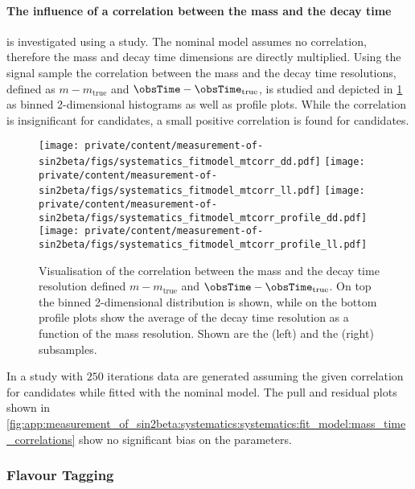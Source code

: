 \paragraph{The influence of a correlation between the mass and the decay time}
is investigated using a \ToyMC study. The nominal \PDF model assumes no
correlation, therefore the mass and decay time dimensions are directly
multiplied. Using the signal \MC sample the correlation between the mass and the
decay time resolutions, defined as $m-m_\text{true}$ and
$\obsTime-\obsTime_\text{true}$, is studied and depicted in
\cref{fit:measurement_of_sin2beta:systematics:systematics:fit_model:mass_time_correlations} 
as binned 2-dimensional histograms as well as profile plots. While the
correlation is insignificant for \catDD candidates, a small positive correlation
is found for \catLL candidates.
%
\begin{figure}[h]
  \texttt{[image: private/content/measurement-of-sin2beta/figs/systematics\_fitmodel\_mtcorr\_dd.pdf]}\hfill
  \texttt{[image: private/content/measurement-of-sin2beta/figs/systematics\_fitmodel\_mtcorr\_ll.pdf]}
  \texttt{[image: private/content/measurement-of-sin2beta/figs/systematics\_fitmodel\_mtcorr\_profile\_dd.pdf]}\hfill
  \texttt{[image: private/content/measurement-of-sin2beta/figs/systematics\_fitmodel\_mtcorr\_profile\_ll.pdf]}
\caption{Visualisation of the correlation between the mass and the decay time
resolution defined $m-m_\text{true}$ and $\obsTime-\obsTime_\text{true}$. On top
the binned 2-dimensional distribution is shown, while on the bottom profile
plots show the average of the decay time resolution as a function of the mass
resolution. Shown are the (left) \catDD and the (right) \catLL subsamples.}
\label{fit:measurement_of_sin2beta:systematics:systematics:fit_model:mass_time_correlations}
\end{figure}
%
In a study with $\num{250}$ iterations data are generated assuming the given
correlation for \catLL candidates while fitted with the nominal model. The pull
and residual plots shown in 
\cref{fig:app:measurement_of_sin2beta:systematics:systematics:fit_model:mass_time_correlations} 
show no significant bias on the \CP parameters.

\subsubsection{Flavour Tagging}
\label{sec:measurement_of_sin2beta:systematics:systematics:tagging}


